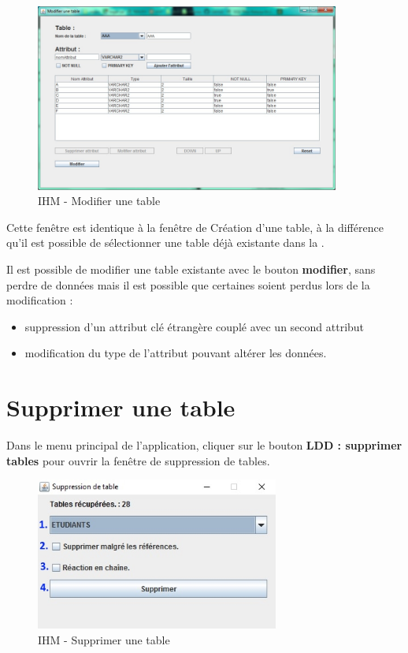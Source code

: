 \begin{figure}[!h]
\centering
\includegraphics[width=10cm]{./images/manuel/modifier_tables.jpg}
\caption{IHM - Modifier une table}
\label{modifier_table}
\end{figure}

Cette fenêtre est identique à la fenêtre de Création d'une table, à la différence qu'il est possible de sélectionner une table déjà existante dans la \bdd. 

Il est possible de modifier une table existante avec le bouton \textbf{modifier}, sans perdre de données mais il est possible que certaines soient perdus lors de la modification :
\begin{itemize}
\item suppression d'un attribut clé étrangère couplé avec un second attribut
\item modification du type de l'attribut pouvant altérer les données.
\end{itemize}





\section{Supprimer une table}
Dans le menu principal de l'application, cliquer sur le bouton \textbf{LDD : supprimer tables} pour ouvrir la fen\^etre de suppression de tables.

\begin{figure}[!h]
\centering
\includegraphics[width=8cm]{./images/manuel/supprimer_table.jpg}
\caption{IHM - Supprimer une table}
\label{supprimer_table}
\end{figure}

